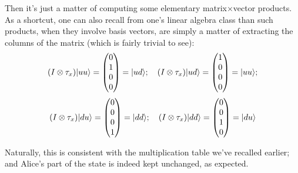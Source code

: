 \documentclass[solutions.tex]{subfiles}
\begin{document}
Then it's just a matter of computing some elementary matrix$\times$vector
products. As a shortcut, one can also recall from one's linear algebra class
than such products, when they involve basis vectors, are simply a matter
of extracting the columns of the matrix (which is fairly trivial to see):
\[
	(I\otimes\tau_x)|uu\rangle = \begin{pmatrix}
		0 \\
		1 \\
		0 \\
		0 \\
	\end{pmatrix} = |ud\rangle;\quad
	(I\otimes\tau_x)|ud\rangle = \begin{pmatrix}
		1 \\
		0 \\
		0 \\
		0 \\
	\end{pmatrix} = |uu\rangle;
\]
\[
	(I\otimes\tau_x)|du\rangle = \begin{pmatrix}
		0 \\
		0 \\
		0 \\
		1 \\
	\end{pmatrix} = |dd\rangle;\quad
	(I\otimes\tau_x)|dd\rangle = \begin{pmatrix}
		0 \\
		0 \\
		1 \\
		0 \\
	\end{pmatrix} = |du\rangle
\]
\begin{remark} Naturally, this is consistent with the multiplication
table we've recalled earlier; and Alice's part of the state is indeed
kept unchanged, as expected.
\end{remark}
\end{document}
